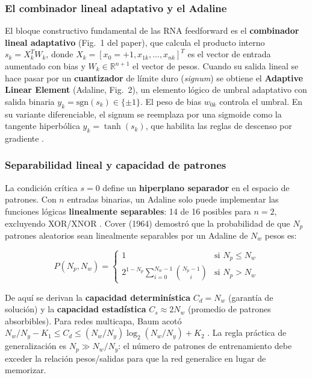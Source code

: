 \documentclass[11pt,a4paper]{article}
\newcommand{\R}{\mathbb{R}}
\begin{document}
\subsubsection{El combinador lineal adaptativo y el Adaline}

El bloque constructivo fundamental de las RNA feedforward es el \textbf{combinador lineal
adaptativo} (Fig.~1 del paper), que calcula el producto interno $s_k = X_k^T W_k$, donde
$X_k = [x_0=+1, x_{1k}, \ldots, x_{nk}]^T$ es el vector de entrada aumentado con bias y
$W_k \in \R^{n+1}$ el vector de pesos. Cuando su salida lineal se hace pasar por un
\textbf{cuantizador} de límite duro (\textit{signum}) se obtiene el \textbf{Adaptive Linear
Element} (Adaline, Fig.~2), un elemento lógico de umbral adaptativo con salida binaria
$y_k = \mathrm{sgn}(s_k) \in \{\pm1\}$. El peso de bias $w_{0k}$ controla el umbral. En su
variante diferenciable, el signum se reemplaza por una sigmoide como la tangente hiperbólica
$y_k = \tanh(s_k)$, que habilita las reglas de descenso por gradiente \cite{widrow1990}.

\subsubsection{Separabilidad lineal y capacidad de patrones}

La condición crítica $s = 0$ define un \textbf{hiperplano separador} en el espacio de patrones.
Con $n$ entradas binarias, un Adaline solo puede implementar las funciones lógicas
\textbf{linealmente separables}: 14 de 16 posibles para $n=2$, excluyendo XOR/XNOR
\cite{widrow1990}. Cover (1964) \cite{cover1965} demostró que la probabilidad de que $N_p$
patrones aleatorios sean linealmente separables por un Adaline de $N_w$ pesos es:

\begin{equation}
P(N_p, N_w) =
\begin{cases}
1 & \text{si } N_p \leq N_w \\[4pt]
2^{1-N_p} \displaystyle\sum_{i=0}^{N_w-1} \binom{N_p-1}{i} & \text{si } N_p > N_w
\end{cases}
\label{eq:cover}
\end{equation}

De aquí se derivan la \textbf{capacidad determinística} $C_d = N_w$ (garantía de solución) y la
\textbf{capacidad estadística} $C_s \approx 2N_w$ (promedio de patrones absorbibles). Para redes
multicapa, Baum acotó $N_w/N_y - K_1 \leq C_d \leq (N_w/N_y)\log_2(N_w/N_y) + K_2$
\cite{widrow1990}. La regla práctica de generalización es $N_p \gg N_w/N_y$: el número de patrones
de entrenamiento debe exceder la relación pesos/salidas para que la red generalice en lugar de
memorizar.
\end{document}
